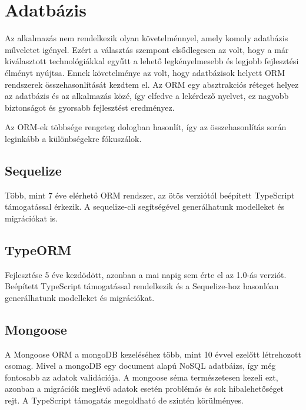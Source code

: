\section{Adatbázis}
Az alkalmazás nem rendelkezik olyan követelménnyel, amely komoly adatbázis műveletet igényel.
Ezért a választás szempont elsődlegesen az volt, hogy a már kiválasztott technológiákkal egyűtt a lehető legkényelmesebb és legjobb fejlesztési élményt nyújtsa. Ennek követelménye az volt, hogy adatbázisok helyett ORM rendszerek összehasonlítását kezdtem el.
Az ORM egy absztrakciós réteget helyez az adatbázis és az alkalmazás közé, így elfedve a lekérdező nyelvet, ez nagyobb biztonságot és gyorsabb fejlesztést eredményez.

Az ORM-ek többsége rengeteg dologban hasonlít, így az összehasonlítás során leginkább a különbségekre fókuszálok.

\subsection{Sequelize}
Több, mint 7 éve elérhető ORM rendszer, az ötös verziótól beépített TypeScript támogatással érkezik.
A sequelize-cli segítségével generálhatunk modelleket és migrációkat is.

\subsection{TypeORM}
Fejlesztése 5 éve kezdödött, azonban a mai napig sem érte el az 1.0-ás verziót.
Beépített TypeScript támogatással rendelkezik és a Sequelize-hoz hasonlóan generálhatunk modelleket és migrációkat.


\subsection{Mongoose}
A Mongoose ORM a mongoDB kezeléséhez több, mint 10 évvel ezelőtt létrehozott csomag. 
Mivel a mongoDB egy document alapú NoSQL adatbáizs, így még fontosabb az adatok validációja.
A mongoose séma természetesen kezeli ezt, azonban a migrációk meglévő adatok esetén problémás és sok hibalehetőséget rejt.
A TypeScript támogatás megoldható de szintén körülményes.

